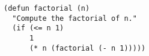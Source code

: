 \documentclass{article}
\begin{document}
\begin{lstlisting}[caption={Example of Common Lisp code}]
(defun factorial (n)
  "Compute the factorial of n."
  (if (<= n 1)
      1
      (* n (factorial (- n 1)))))
\end{lstlisting}
\end{document}
